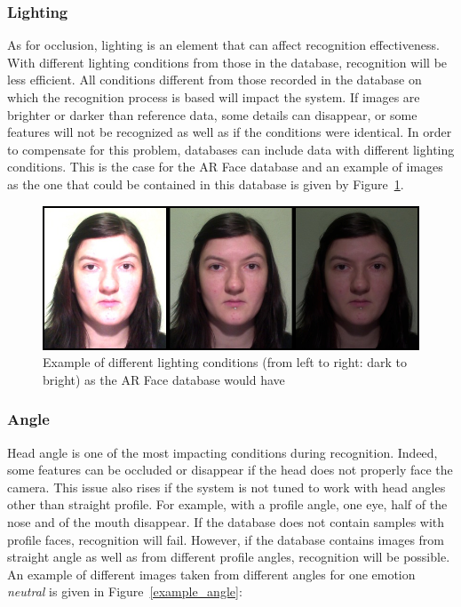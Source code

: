 \subsubsection{Lighting}

\vspace{\baselineskip}
\noindent As for occlusion, lighting is an element that can affect recognition effectiveness. With different lighting conditions from those in the database, recognition will be less efficient. All conditions different from those recorded  in the database on which the recognition process is based will impact the system. If images are brighter or darker than reference data, some details can disappear, or some features will not be recognized as well as if the conditions were identical. In order to compensate for this problem, databases can include data with different lighting conditions. This is the case for the AR Face database \cite{ARFACE} and an example of images as the one that could be contained in this database is given by Figure~\ref{arface_example1}.
\newline

\begin{figure}[!h]
\begin{center}
\noindent \includegraphics[scale=0.3]{figures/arface_example1} 
\newline
\caption{Example of different lighting conditions (from left to right: dark to bright) as the AR Face database would have}
\label{arface_example1}
\end{center} 
\end{figure}

\subsubsection{Angle}

\vspace{\baselineskip}
\noindent Head angle is one of the most impacting conditions during recognition. Indeed, some features can be occluded or disappear if the head does not properly face the camera. This issue also rises if the system is not tuned to work with head angles other than straight profile. For example, with a profile angle, one eye, half of the nose and of the mouth disappear. If the database does not contain samples with profile faces, recognition will fail. However, if the database contains images from straight angle as well as from different profile angles, recognition will be possible. An example of different images taken from different angles for one emotion \textit{neutral} is given in Figure~\ref{example_angle}:
\newline

